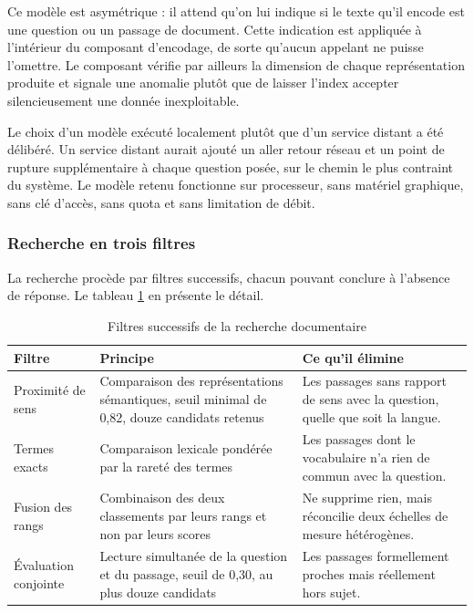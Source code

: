 Ce modèle est asymétrique : il attend qu'on lui indique si le texte qu'il encode est une question ou un passage de document. Cette indication est appliquée à l'intérieur du composant d'encodage, de sorte qu'aucun appelant ne puisse l'omettre. Le composant vérifie par ailleurs la dimension de chaque représentation produite et signale une anomalie plutôt que de laisser l'index accepter silencieusement une donnée inexploitable.

Le choix d'un modèle exécuté localement plutôt que d'un service distant a été délibéré. Un service distant aurait ajouté un aller retour réseau et un point de rupture supplémentaire à chaque question posée, sur le chemin le plus contraint du système. Le modèle retenu fonctionne sur processeur, sans matériel graphique, sans clé d'accès, sans quota et sans limitation de débit.

\subsubsection{Recherche en trois filtres}

La recherche procède par filtres successifs, chacun pouvant conclure à l'absence de réponse. Le tableau \ref{tab:rag-filtres} en présente le détail.

\begin{table}[H]
\centering
\renewcommand{\arraystretch}{1.2}
\begin{tabular}{|p{3.0cm}|p{5.3cm}|p{6.2cm}|}
\hline
\textbf{Filtre} & \textbf{Principe} & \textbf{Ce qu'il élimine} \\
\hline
Proximité de sens & Comparaison des représentations sémantiques, seuil minimal de 0,82, douze candidats retenus & Les passages sans rapport de sens avec la question, quelle que soit la langue. \\
\hline
Termes exacts & Comparaison lexicale pondérée par la rareté des termes \cite{bm25} & Les passages dont le vocabulaire n'a rien de commun avec la question. \\
\hline
Fusion des rangs & Combinaison des deux classements par leurs rangs et non par leurs scores \cite{rrf} & Ne supprime rien, mais réconcilie deux échelles de mesure hétérogènes. \\
\hline
Évaluation conjointe & Lecture simultanée de la question et du passage, seuil de 0,30, au plus douze candidats & Les passages formellement proches mais réellement hors sujet. \\
\hline
\end{tabular}
\caption{Filtres successifs de la recherche documentaire}
\label{tab:rag-filtres}
\end{table}

